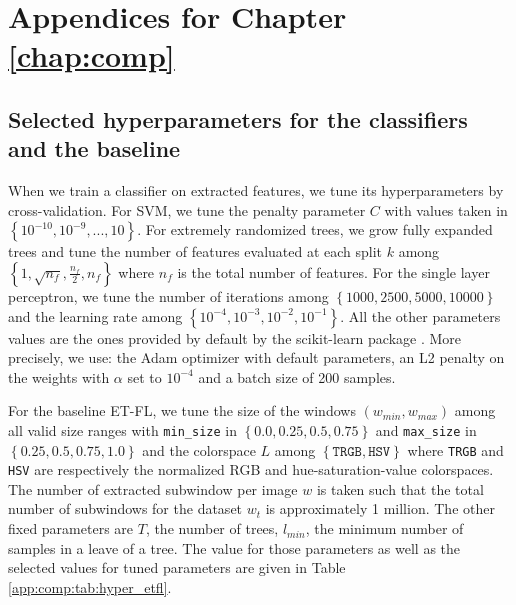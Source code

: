 

\chapter{Appendices for Chapter \ref{chap:comp}}
\label{app:comp}

\section{Selected hyperparameters for the classifiers and the baseline}
\label{app:comp:sec:selectedhyperparameters}

When we train a classifier on extracted features, we tune its hyperparameters by cross-validation. For SVM, we tune the penalty parameter $C$ with values taken in 
$\left\{10^{-10}, 10^{-9},...,10\right\}$. For extremely randomized trees, we grow fully expanded trees and tune the number of features evaluated at each split $k$ among $\left\{1, \sqrt{n_f}, \frac{n_f}{2}, n_f\right\}$ where 
$n_f$ is the total number of features. For the single layer perceptron, we tune the number of iterations among $\left\{1000, 2500, 5000, 10000\right\}$ and the learning rate among $\left\{10^{-4}, 10^{-3}, 10^{-2}, 10^{-1}\right\}$. All the other parameters values are the ones provided by default by the scikit-learn package \cite{scikit-learn}. More precisely, we use: the Adam \cite{kingma2014adam} optimizer with default parameters, an L2 penalty on the weights with $\alpha$ set to $10^{-4}$ and a batch size of 200 samples.

For the baseline ET-FL, we tune the size of the windows $\left(w_{min}, w_{max}\right)$ among all valid size ranges with \texttt{min\_size} in $\left\{0.0, 0.25, 0.5, 0.75\right\}$ and \texttt{max\_size} in $\left\{0.25, 0.5, 0.75, 1.0\right\}$ and the colorspace $L$ among $\left\{\texttt{TRGB}, \texttt{HSV}\right\}$ where \texttt{TRGB} and \texttt{HSV} are respectively the normalized RGB and hue-saturation-value colorspaces. The number of extracted subwindow per image $w$ is taken such that the total number of subwindows for the dataset $w_t$ is approximately 1 million. The other fixed parameters are $T$, the number of trees, $l_{min}$, the minimum number of samples in a leave of a tree. The value for those parameters as well as the selected values for tuned parameters are given in Table \ref{app:comp:tab:hyper_etfl}. 


